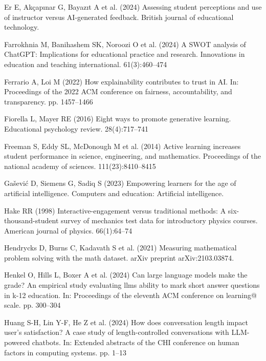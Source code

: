 \documentclass[
  11pt,
]{article}
\newlength{\cslhangindent}
\newenvironment{CSLReferences}[2] %
 {\begin{list}{}{%
  \setlength{\itemindent}{0pt}
  \setlength{\leftmargin}{0pt}
  \setlength{\parsep}{0pt}
  \ifodd #1
   \setlength{\leftmargin}{\cslhangindent}
   \setlength{\itemindent}{-1\cslhangindent}
  \fi
  \setlength{\itemsep}{#2\baselineskip}}}
 {\end{list}}
\begin{document}
\begin{CSLReferences}{1}{0}
Er E, Akçapınar G, Bayazıt A et al. (2024) Assessing student perceptions and use of instructor versus AI-generated feedback. British journal of educational technology.

Farrokhnia M, Banihashem SK, Noroozi O et al. (2024) A SWOT analysis of ChatGPT: Implications for educational practice and research. Innovations in education and teaching international. 61(3):460--474

Ferrario A, Loi M (2022) How explainability contributes to trust in AI. In: Proceedings of the 2022 ACM conference on fairness, accountability, and transparency. pp. 1457--1466

Fiorella L, Mayer RE (2016) Eight ways to promote generative learning. Educational psychology review. 28(4):717--741

Freeman S, Eddy SL, McDonough M et al. (2014) Active learning increases student performance in science, engineering, and mathematics. Proceedings of the national academy of sciences. 111(23):8410--8415

Gašević D, Siemens G, Sadiq S (2023) Empowering learners for the age of artificial intelligence. Computers and education: Artificial intelligence.

Hake RR (1998) Interactive-engagement versus traditional methods: A six-thousand-student survey of mechanics test data for introductory physics courses. American journal of physics. 66(1):64--74

Hendrycks D, Burns C, Kadavath S et al. (2021) Measuring mathematical problem solving with the math dataset. arXiv preprint arXiv:2103.03874.

Henkel O, Hills L, Boxer A et al. (2024) Can large language models make the grade? An empirical study evaluating llms ability to mark short answer questions in k-12 education. In: Proceedings of the eleventh ACM conference on learning@ scale. pp. 300--304

Huang S-H, Lin Y-F, He Z et al. (2024) How does conversation length impact user's satisfaction? A case study of length-controlled conversations with LLM-powered chatbots. In: Extended abstracts of the CHI conference on human factors in computing systems. pp. 1--13


\end{CSLReferences}
\end{document}
